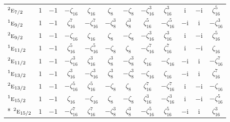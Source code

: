 \documentclass[10pt,a4paper]{article}
\numberwithin{equation}{section}
\newcommand{\irr}[1]{\text{\normalfont\scshape #1}}
\newcommand{\conjpair}[1]{{}^{#1}}
\newcommand{\iunit}{\mathrm{i}}
\newcommand{\rootunity}[1]{\zeta_{#1}}
\begin{document}
{\begin{longtable}{@{}lccccccccccc@{}}
$\conjpair{2}\irr{e}_{7/2}$ & $1$ & $-1$ & $-\rootunity{16}$ & $\rootunity{16}$ & $\rootunity{8}$ & $-\rootunity{8}$ & $-\rootunity{16}^{3}$ & $\rootunity{16}^{3}$ & $\iunit{}$ & $-\iunit{}$ & $\rootunity{16}^{5}$\\
$\conjpair{1}\irr{e}_{9/2}$ & $1$ & $-1$ & $\rootunity{16}^{7}$ & $-\rootunity{16}^{7}$ & $-\rootunity{8}^{3}$ & $\rootunity{8}^{3}$ & $\rootunity{16}^{5}$ & $-\rootunity{16}^{5}$ & $-\iunit{}$ & $\iunit{}$ & $-\rootunity{16}^{3}$\\
$\conjpair{2}\irr{e}_{9/2}$ & $1$ & $-1$ & $-\rootunity{16}$ & $\rootunity{16}$ & $\rootunity{8}$ & $-\rootunity{8}$ & $-\rootunity{16}^{3}$ & $\rootunity{16}^{3}$ & $\iunit{}$ & $-\iunit{}$ & $\rootunity{16}^{5}$\\
$\conjpair{1}\irr{e}_{11/2}$ & $1$ & $-1$ & $\rootunity{16}^{5}$ & $-\rootunity{16}^{5}$ & $-\rootunity{8}$ & $\rootunity{8}$ & $-\rootunity{16}^{7}$ & $\rootunity{16}^{7}$ & $\iunit{}$ & $-\iunit{}$ & $\rootunity{16}$\\
$\conjpair{2}\irr{e}_{11/2}$ & $1$ & $-1$ & $-\rootunity{16}^{3}$ & $\rootunity{16}^{3}$ & $\rootunity{8}^{3}$ & $-\rootunity{8}^{3}$ & $\rootunity{16}$ & $-\rootunity{16}$ & $-\iunit{}$ & $\iunit{}$ & $-\rootunity{16}^{7}$\\
$\conjpair{1}\irr{e}_{13/2}$ & $1$ & $-1$ & $\rootunity{16}^{3}$ & $-\rootunity{16}^{3}$ & $\rootunity{8}^{3}$ & $-\rootunity{8}^{3}$ & $-\rootunity{16}$ & $\rootunity{16}$ & $-\iunit{}$ & $\iunit{}$ & $\rootunity{16}^{7}$\\
$\conjpair{2}\irr{e}_{13/2}$ & $1$ & $-1$ & $-\rootunity{16}^{5}$ & $\rootunity{16}^{5}$ & $-\rootunity{8}$ & $\rootunity{8}$ & $\rootunity{16}^{7}$ & $-\rootunity{16}^{7}$ & $\iunit{}$ & $-\iunit{}$ & $-\rootunity{16}$\\
$\conjpair{1}\irr{e}_{15/2}$ & $1$ & $-1$ & $\rootunity{16}$ & $-\rootunity{16}$ & $\rootunity{8}$ & $-\rootunity{8}$ & $\rootunity{16}^{3}$ & $-\rootunity{16}^{3}$ & $\iunit{}$ & $-\iunit{}$ & $-\rootunity{16}^{5}$\\*
$\conjpair{2}\irr{e}_{15/2}$ & $1$ & $-1$ & $-\rootunity{16}^{7}$ & $\rootunity{16}^{7}$ & $-\rootunity{8}^{3}$ & $\rootunity{8}^{3}$ & $-\rootunity{16}^{5}$ & $\rootunity{16}^{5}$ & $-\iunit{}$ & $\iunit{}$ & $\rootunity{16}^{3}$\\
\bottomrule\end{longtable}}
\end{document}
